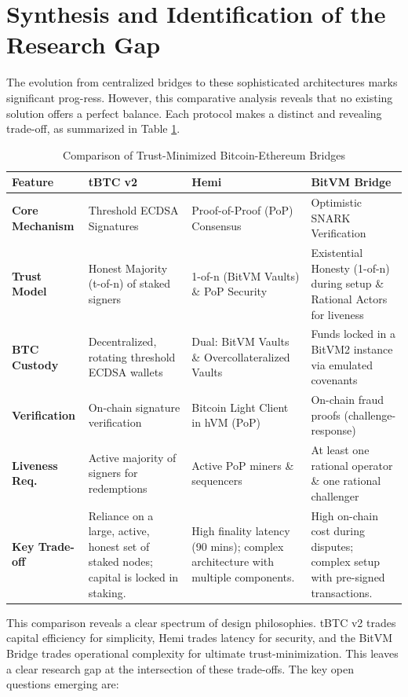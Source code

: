 \documentclass{DESSThesis}
\begin{document}
\section{Synthesis and Identification of the Research Gap}
The evolution from centralized bridges to these sophisticated architectures marks significant prog-ress. However, this comparative analysis reveals that no existing solution offers a perfect balance. Each protocol makes a distinct and revealing trade-off, as summarized in Table \ref{tab:trust_minimized_bridge_comparison}.

\begin{table}[ht]
\centering
\begin{tabularx}{\textwidth}{|l|X|X|X|}
\hline
\textbf{Feature} & \textbf{tBTC v2} & \textbf{Hemi} & \textbf{BitVM Bridge} \\
\hline
\textbf{Core Mechanism} & Threshold ECDSA Signatures & Proof-of-Proof (PoP) Consensus & Optimistic SNARK Verification \\
\hline
\textbf{Trust Model} & Honest Majority (t-of-n) of staked signers & 1-of-n (BitVM Vaults) \& PoP Security & Existential Honesty (1-of-n) during setup \& Rational Actors for liveness \\
\hline
\textbf{BTC Custody} & Decentralized, rotating threshold ECDSA wallets & Dual: BitVM Vaults \& Overcollateralized Vaults & Funds locked in a BitVM2 instance via emulated covenants \\
\hline
\textbf{Verification} & On-chain signature verification & Bitcoin Light Client in hVM (PoP) & On-chain fraud proofs (challenge-response) \\
\hline
\textbf{Liveness Req.} & Active majority of signers for redemptions & Active PoP miners \& sequencers & At least one rational operator \& one rational challenger \\
\hline
\textbf{Key Trade-off} & 
Reliance on a large, active, honest set of staked nodes; capital is locked in staking. & 
High finality latency (90 mins); complex architecture with multiple components. & 
High on-chain cost during disputes; complex setup with pre-signed transactions. \\
\hline
\end{tabularx}
\caption{Comparison of Trust-Minimized Bitcoin-Ethereum Bridges}
\label{tab:trust_minimized_bridge_comparison}
\end{table}

This comparison reveals a clear spectrum of design philosophies. tBTC v2 trades capital efficiency for simplicity, Hemi trades latency for security, and the BitVM Bridge trades operational complexity for ultimate trust-minimization. This leaves a clear research gap at the intersection of these trade-offs. The key open questions emerging are:
\end{document}
